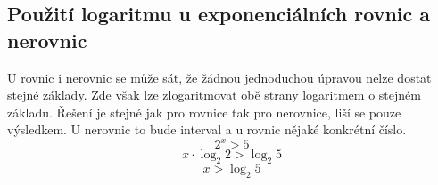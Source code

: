 \subsection {Použití logaritmu u exponenciálních rovnic a nerovnic}
U rovnic i nerovnic se může sát, že žádnou jednoduchou úpravou nelze dostat stejné základy. Zde však lze zlogaritmovat obě strany logaritmem o stejném základu. Řešení je stejné jak pro rovnice tak pro nerovnice, liší se pouze výsledkem. U nerovnic to bude interval a u rovnic nějaké konkrétní číslo.
$$2^x>5$$
$$x\cdot\log_{2}2>\log_{2}5$$
$$x>\log_{2}5$$